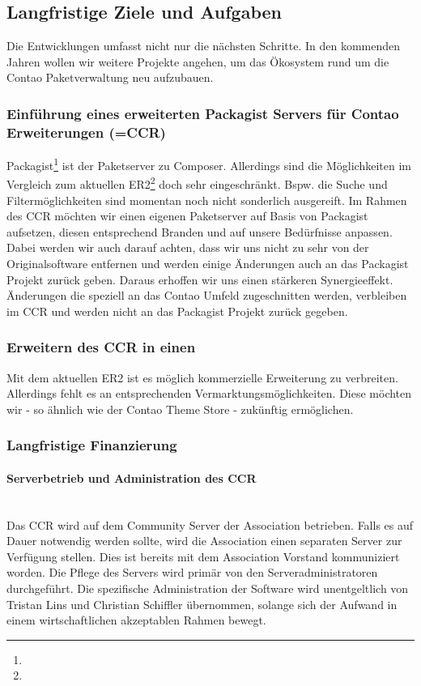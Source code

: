 \documentclass[
paper=a4,
draft=false,%
fontsize=10pt%
]{scrartcl}
\begin{document}
\subsection{Langfristige Ziele und Aufgaben}

Die Entwicklungen umfasst nicht nur die nächsten Schritte. In den kommenden Jahren wollen wir weitere Projekte angehen, um das Ökosystem rund um die Contao Paketverwaltung neu aufzubauen.

\subsubsection{Einführung eines erweiterten Packagist Servers für Contao Erweiterungen (=CCR)}

Packagist\footnote{} ist der Paketserver zu Composer. Allerdings sind die Möglichkeiten im Vergleich zum aktuellen ER2\footnote{} doch sehr eingeschränkt. Bspw. die Suche und Filtermöglichkeiten sind momentan noch nicht sonderlich ausgereift. Im Rahmen des CCR möchten wir einen eigenen Paketserver auf Basis von Packagist aufsetzen, diesen entsprechend Branden und auf unsere Bedürfnisse anpassen.\\
Dabei werden wir auch darauf achten, dass wir uns nicht zu sehr von der Originalsoftware entfernen und werden einige Änderungen auch an das Packagist Projekt zurück geben. Daraus erhoffen wir uns einen stärkeren Synergieeffekt. Änderungen die speziell an das Contao Umfeld zugeschnitten werden, verbleiben im CCR und werden nicht an das Packagist Projekt zurück gegeben.

\subsubsection{Erweitern des CCR in einen }

Mit dem aktuellen ER2 ist es möglich kommerzielle Erweiterung zu verbreiten. Allerdings fehlt es an entsprechenden Vermarktungsmöglichkeiten. Diese möchten wir - so ähnlich wie der Contao Theme Store - zukünftig ermöglichen.

\subsubsection{Langfristige Finanzierung}

\paragraph{Serverbetrieb und Administration des CCR} ~\\
Das CCR wird auf dem Community Server der Association betrieben. Falls es auf Dauer notwendig werden sollte, wird die Association einen separaten Server zur Verfügung stellen. Dies ist bereits mit dem Association Vorstand kommuniziert worden.
Die Pflege des Servers wird primär von den Serveradministratoren durchgeführt. Die spezifische Administration der Software wird unentgeltlich von Tristan Lins und Christian Schiffler übernommen, solange sich der Aufwand in einem wirtschaftlichen akzeptablen Rahmen bewegt.
\end{document}
